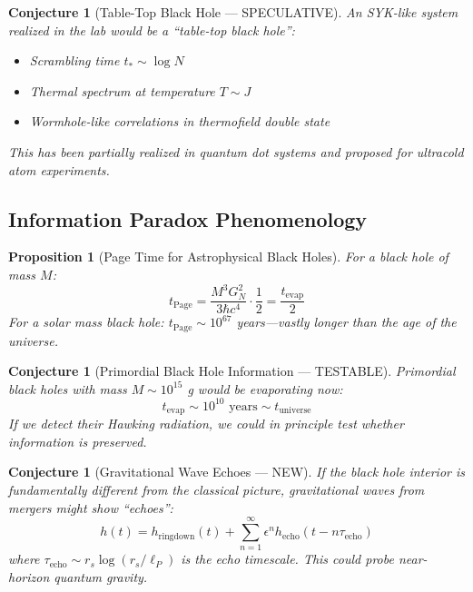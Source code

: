 \documentclass[12pt,a4paper]{article}
\newtheorem{conjecture}[theorem]{Conjecture}
\newtheorem{proposition}[theorem]{Proposition}
\begin{document}
\begin{conjecture}[Table-Top Black Hole --- SPECULATIVE]
An SYK-like system realized in the lab would be a ``table-top black hole'':
\begin{itemize}
    \item Scrambling time $t_* \sim \log N$
    \item Thermal spectrum at temperature $T \sim J$
    \item Wormhole-like correlations in thermofield double state
\end{itemize}
This has been partially realized in quantum dot systems and proposed for ultracold atom experiments.
\end{conjecture}

\subsection{Information Paradox Phenomenology}

\begin{proposition}[Page Time for Astrophysical Black Holes]
For a black hole of mass $M$:
\begin{equation}
t_{\text{Page}} = \frac{M^3 G_N^2}{3\hbar c^4} \cdot \frac{1}{2} = \frac{t_{\text{evap}}}{2}
\end{equation}
For a solar mass black hole: $t_{\text{Page}} \sim 10^{67}$ years---vastly longer than the age of the universe.
\end{proposition}

\begin{conjecture}[Primordial Black Hole Information --- TESTABLE]
Primordial black holes with mass $M \sim 10^{15}$ g would be evaporating \textit{now}:
\begin{equation}
t_{\text{evap}} \sim 10^{10} \text{ years} \sim t_{\text{universe}}
\end{equation}
If we detect their Hawking radiation, we could in principle test whether information is preserved.
\end{conjecture}

\begin{conjecture}[Gravitational Wave Echoes --- NEW]
If the black hole interior is fundamentally different from the classical picture, gravitational waves from mergers might show ``echoes'':
\begin{equation}
h(t) = h_{\text{ringdown}}(t) + \sum_{n=1}^\infty \epsilon^n h_{\text{echo}}(t - n \tau_{\text{echo}})
\end{equation}
where $\tau_{\text{echo}} \sim r_s \log(r_s/\ell_P)$ is the echo timescale. This could probe near-horizon quantum gravity.
\end{conjecture}
\end{document}
